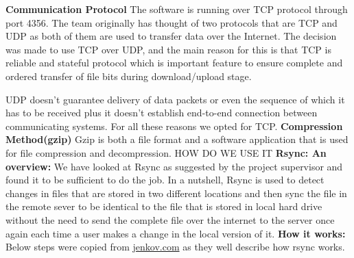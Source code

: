 \documentclass{article}
\begin{document}
\hfill \break
\textbf{Communication Protocol}
The software is running over TCP protocol through port 4356. The team originally has thought of two protocols that are TCP and UDP as both of them are used to transfer data over the Internet. The decision was made to use TCP over UDP, and the main reason for this is that TCP is reliable and stateful protocol which is important feature to ensure complete and ordered transfer of file bits during download/upload stage.

UDP doesn’t guarantee delivery of data packets or even the sequence of which it has to be received plus it doesn’t establish end-to-end connection between communicating systems. For all these reasons we opted for TCP.
\newline
\hfill \break
\textbf{Compression Method(gzip)}
Gzip is both a file format and a software application that is used for file compression and decompression. HOW DO WE USE IT
\textbf{Rsync: An overview:} We have looked at Rsync as suggested by the project supervisor and found it to be sufficient to do the job. In a nutshell, Rsync is used to detect changes in files that are stored in two different locations and then sync the file in the remote sever to be identical to the file that is stored in local hard drive without the need to send the complete file over the internet to the server once again each time a user makes a change in the local version of it.
\newline
\hfill \break
\textbf{How it works:}
Below steps were copied from \underline{jenkov.com} as they well describe how rsync works.
\end{document}
